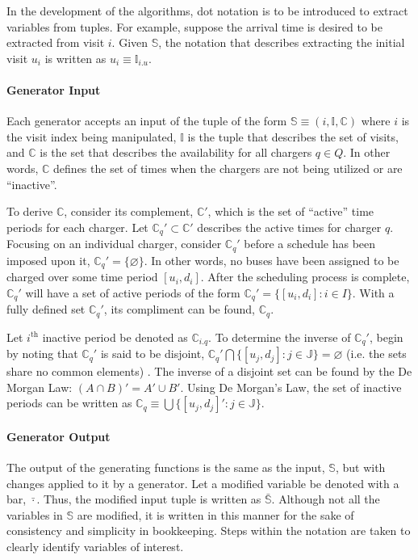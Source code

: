 \documentclass[11pt,a4paper,final]{article}
\newcommand{\I}{\mathbb{I}}                 %
\newcommand{\C}{\mathbb{C}}                 %
\newcommand{\Sol}{\mathbb{S}}               %
\newcommand{\Qset}{Q}                       %
\newcommand{\Jsetq}{\mathbb{J}}             %
\begin{document}
In the development of the algorithms, dot notation is to be introduced to extract variables from tuples. For example,
suppose the arrival time is desired to be extracted from visit \(i\). Given \(\Sol\), the notation that describes extracting
the initial visit \(u_i\) is written as \(u_i \equiv \I_{i.u}\).

\paragraph{Generator Input}
\label{sec:org7f2db2c}
Each generator accepts an input of the tuple of the form \(\Sol \equiv (i, \I, \C)\) where \(i\) is the visit index being
manipulated, \(\I\) is the tuple that describes the set of visits, and \(\C\) is the set that describes the availability for
all chargers \(q \in \Qset\). In other words, \(\C\) defines the set of times when the chargers are not being utilized or are
``inactive''.

To derive \(\C\), consider its complement, \(\C'\), which is the set of ``active'' time periods for each charger. Let \(\C_q' \subset
\C'\) describes the active times for charger \(q\). Focusing on an individual charger, consider \(\C_q'\) before a schedule
has been imposed upon it, \(\C_q' = \{ \varnothing \}\). In other words, no buses have been assigned to be charged over
some time period \([u_i, d_i]\). After the scheduling process is complete, \(\C_q'\) will have a set of active periods of
the form \(\C_q' = \{[u_i, d_i]: i \in I\}\). With a fully defined set \(\C_q'\), its compliment can be found, \(\C_q\).

Let \(i^{\text{th}}\) inactive period be denoted as \(\C_{i.q}\). To determine the inverse of \(\C_q'\), begin by noting that
\(\C_q'\) is said to be disjoint, \(\C_q' \bigcap \{[u_j, d_j] : j \in \Jsetq\} = \varnothing\) (i.e. the sets share no common
elements) \cite{halmos-1974-naive-set-theor}. The inverse of a disjoint set can be found by the De Morgan Law: \((A \cap
B)' = A' \cup B'\). Using De Morgan's Law, the set of inactive periods can be written as \(\C_q \equiv \bigcup \{[u_j, d_j]': j \in
\Jsetq\}\).

\paragraph{Generator Output}
\label{sec:orgf05caca}
The output of the generating functions is the same as the input, \(\Sol\), but with changes applied to it by a generator.
Let a modified variable be denoted with a bar, \(\bar{\cdot}\). Thus, the modified input tuple is written as \(\bar{\Sol}\).
Although not all the variables in \(\Sol\) are modified, it is written in this manner for the sake of consistency and
simplicity in bookkeeping. Steps within the notation are taken to clearly identify variables of interest.
\end{document}
